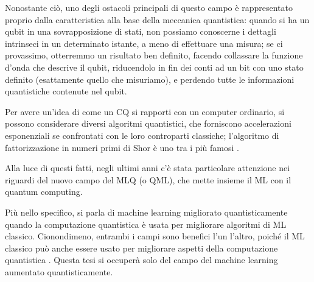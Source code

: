 
Nonostante ciò, uno degli ostacoli principali di questo campo è rappresentato proprio dalla 
caratteristica alla base della meccanica quantistica: quando si ha un qubit 
in una sovrapposizione di stati, non possiamo conoscerne i dettagli intrinseci 
in un determinato istante, a meno di effettuare una misura; se ci provassimo, 
otterremmo un risultato ben definito, facendo collassare la funzione d'onda 
che descrive il qubit, riducendolo in fin dei conti ad un bit con uno stato definito (esattamente 
quello che misuriamo), e perdendo tutte le informazioni quantistiche 
contenute nel qubit. 


Per avere un'idea di come un \ac{CQ} si rapporti con un computer ordinario, 
si possono considerare diversi algoritmi quantistici, che forniscono 
accelerazioni esponenziali se confrontati con le loro controparti classiche; 
l'algoritmo di fattorizzazione in numeri primi di Shor è uno tra i più famosi \cite{shor}. 


Alla luce di questi fatti, negli ultimi anni c'è stata particolare attenzione nei 
riguardi del nuovo campo del \ac{MLQ} (o \ac{QML}), che mette insieme il \ac{ML} con il quantum 
computing. 

Più nello specifico, si parla di machine learning migliorato quantisticamente quando 
la computazione quantistica è usata per migliorare algoritmi di \ac{ML} classico. 
Cionondimeno, entrambi i campi sono benefici l'un l'altro, 
poiché il \ac{ML} classico può anche essere usato per migliorare aspetti 
della computazione quantistica \cite{PhysRevLett.116.230504}. 
Questa tesi si occuperà solo del campo del machine 
learning aumentato quantisticamente. 

